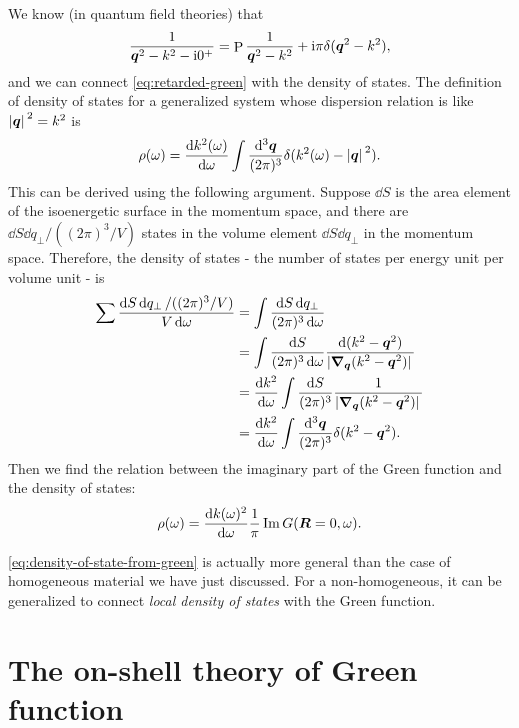 \documentclass[hyperref, a4paper]{article}
\DeclareMathOperator{\primevalue}{P}
\newcommand*{\ii}{\mathrm{i}}
\begin{document}
We know (in quantum field theories) that 
\[
    \frac{1}{\vb*{q}^2 - k^2 - \ii 0^+} = \primevalue \frac{1}{\vb*{q}^2 - k^2} + \ii \pi \delta(\vb*{q}^2 - k^2),
\]
and we can connect \eqref{eq:retarded-green} with the density of states. The definition of density of states 
for a generalized system whose dispersion relation is like $\abs*{\vb*{q}}^2 = k^2$ is 
\begin{equation}
    \rho(\omega) = \dv{k^2(\omega)}{\omega} \int \frac{\dd[3]{\vb*{q}}}{(2\pi)^3} \delta(k^2(\omega) - \abs*{\vb*{q}}^2).
\end{equation}
This can be derived using the following argument. Suppose $\dd{S}$ is the area element of the isoenergetic surface
in the momentum space, and there are $\dd{S} \dd{q_\bot} / ((2\pi)^3 / V)$ states in the volume element 
$\dd{S} \dd{q_\bot}$ in the momentum space. Therefore, the density of states - the number of states per energy unit
per volume unit - is 
\[
    \begin{aligned}
        \sum \frac{\dd{S} \dd{q_\bot} / ((2\pi)^3 / V)}{V \dd{\omega}} &= \int \frac{\dd{S} \dd{q_\bot}}{(2\pi)^3 \dd{\omega}} \\
        &=  \int \frac{\dd{S} }{(2\pi)^3 \dd{\omega}} \frac{\dd{(k^2 - \vb*{q}^2)}}{\abs*{\grad_{\vb*{q}} (k^2 - \vb*{q}^2)}} \\
        &= \dv{k^2}{\omega} \int \frac{\dd{S}}{(2\pi)^3} \frac{1}{\abs*{\grad_{\vb*{q}} (k^2 - \vb*{q}^2)}} \\
        &= \dv{k^2}{\omega} \int \frac{\dd[3]{\vb*{q}}}{(2\pi)^3} \delta(k^2 - \vb*{q}^2).
    \end{aligned}
\]
Then we find the relation between the imaginary part of the Green function and the density of states:
\begin{equation}
    \rho(\omega) = \dv{k(\omega)^2}{\omega} \frac{1}{\pi} \Im G(\vb*{R} = 0, \omega).
    \label{eq:density-of-state-from-green}
\end{equation}

\eqref{eq:density-of-state-from-green} is actually more general than the case of homogeneous material 
we have just discussed. For a non-homogeneous, it can be generalized to connect \emph{local density of states} 
with the Green function.

\section{The on-shell theory of Green function}
\end{document}
